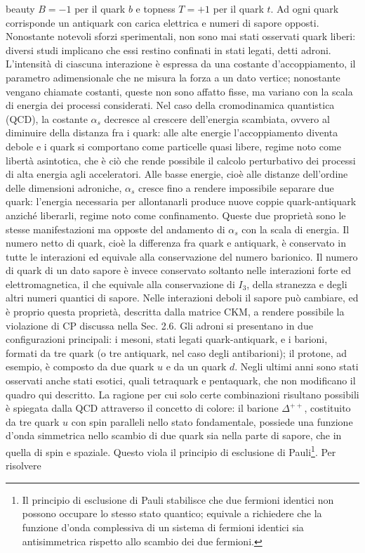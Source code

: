 \documentclass[11pt,a4paper,twoside,openright]{report}
\begin{document}
beauty $B = -1$ per il quark $b$ e topness $T = +1$ per il quark $t$. Ad ogni quark corrisponde un antiquark con carica elettrica e numeri di sapore opposti. Nonostante notevoli sforzi sperimentali, non sono mai stati osservati quark liberi: diversi studi implicano che essi restino confinati in stati legati, detti adroni. L'intensità di ciascuna interazione è espressa da una costante d'accoppiamento, il parametro adimensionale che ne misura la forza a un dato vertice; nonostante vengano chiamate costanti, queste non sono affatto fisse, ma variano con la scala di energia dei processi considerati. Nel caso della
cromodinamica quantistica (QCD), la costante $\alpha_s$ decresce al crescere
dell'energia scambiata, ovvero al diminuire della distanza fra i quark: alle alte
energie l'accoppiamento diventa debole e i quark si comportano come particelle
quasi libere, regime noto come libertà asintotica, che è ciò che rende possibile
il calcolo perturbativo dei processi di alta energia agli acceleratori. Alle basse
energie, cioè alle distanze dell'ordine delle dimensioni adroniche, $\alpha_s$
cresce fino a rendere impossibile separare due quark: l'energia necessaria per
allontanarli produce nuove coppie quark-antiquark anziché liberarli, regime noto come confinamento. Queste due proprietà sono le stesse manifestazioni ma opposte del andamento di $\alpha_s$ con la scala di energia. Il numero netto di quark, cioè la
differenza fra quark e antiquark, è conservato in tutte le interazioni ed equivale
alla conservazione del numero barionico. Il numero di quark di un dato sapore è invece
conservato soltanto nelle interazioni forte ed elettromagnetica, il che equivale alla
conservazione di $I_3$, della stranezza e degli altri numeri quantici di sapore. Nelle
interazioni deboli il sapore può cambiare, ed è proprio questa proprietà, descritta
dalla matrice CKM, a rendere possibile la violazione di CP discussa nella
Sec. 2.6. Gli adroni si presentano in due configurazioni principali: i mesoni, stati legati quark-antiquark, e i barioni, formati da tre quark (o tre antiquark, nel caso degli
antibarioni); il protone, ad esempio, è composto da due quark $u$ e da un quark $d$.
Negli ultimi anni sono stati osservati anche stati esotici, quali tetraquark e
pentaquark, che non modificano il quadro qui descritto. La ragione per cui
solo certe combinazioni risultano possibili è spiegata dalla QCD attraverso il
concetto di colore: il barione $\Delta^{++}$, costituito da tre quark $u$
con spin paralleli nello stato fondamentale, possiede una funzione d'onda simmetrica
nello scambio di due quark sia nella parte di sapore, che in quella di spin e spaziale. Questo viola il principio di esclusione di Pauli\footnote{Il principio di esclusione di Pauli stabilisce che due fermioni identici non possono occupare lo stesso stato quantico; equivale a
richiedere che la funzione d'onda complessiva di un sistema di fermioni identici sia
antisimmetrica rispetto allo scambio dei due fermioni.}. Per risolvere
\end{document}
